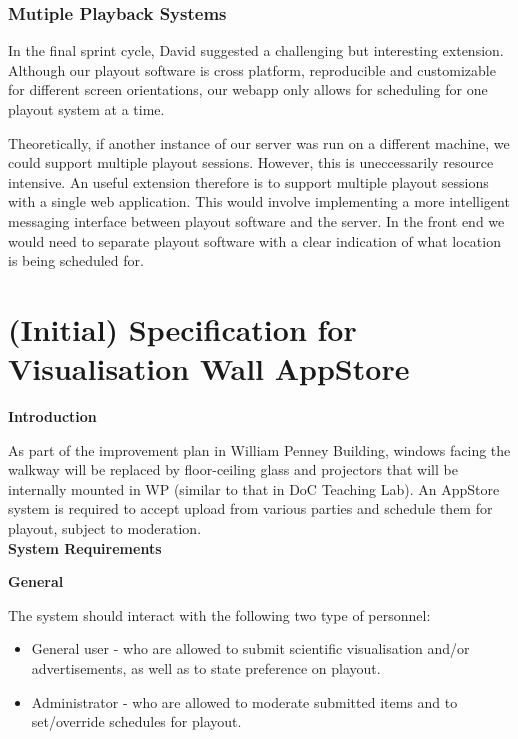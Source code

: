 \documentclass[a4paper, titlepage]{article}
\begin{document}
\subsubsection{Mutiple Playback Systems}
In the final sprint cycle, David suggested a challenging but interesting extension. Although our 
playout software is cross platform, reproducible and customizable for different screen orientations, 
our webapp only allows for scheduling for one playout system at a time. 

Theoretically, if another instance of our server was run on a different machine, we could support 
multiple playout sessions. However, this is uneccessarily resource intensive. An useful extension 
therefore is to support multiple playout sessions with a single web application. This would involve 
implementing a more intelligent messaging interface between playout software and the server. In the 
front end we would need to separate playout software with a clear indication of what location is
being scheduled for. 



\newpage
\appendix

\section{(Initial) Specification for Visualisation Wall AppStore}

\textbf{\Large Introduction}

As part of the improvement plan in William Penney Building, windows facing the walkway will be replaced by floor-ceiling glass and projectors that will be internally mounted in WP (similar to that in DoC Teaching Lab). An AppStore system is required to accept upload from various parties and schedule them for playout, subject to moderation.\\

\textbf{\Large System Requirements} \vspace{5pt}

\textbf{\large General}

The system should interact with the following two type of personnel:

\begin{itemize}
  \item General user - who are allowed to submit scientific visualisation and/or advertisements, as well as to state preference on playout.
  \item Administrator - who are allowed to moderate submitted items and to set/override schedules for playout.
\end{itemize}
\end{document}
